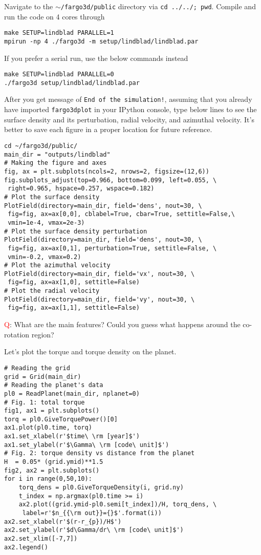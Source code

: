 \documentclass[14pt]{scrartcl}
\begin{document}
Navigate to the \texttt{$\sim$/fargo3d/public} directory via \texttt{cd ../../; pwd}. Compile and run the code on 4 cores through
\begin{verbatim}
make SETUP=lindblad PARALLEL=1
mpirun -np 4 ./fargo3d -m setup/lindblad/lindblad.par
\end{verbatim}
If you prefer a serial run, use the below commands instead
\begin{verbatim}
make SETUP=lindblad PARALLEL=0
./fargo3d setup/lindblad/lindblad.par
\end{verbatim}


After you get message of \texttt{End of the simulation!}, assuming that you already have imported \texttt{fargo3dplot} in your IPython console, type below lines to see the surface density and its perturbation, radial velocity, and azimuthal velocity. It's better to save each figure in a proper location for future reference.
\begin{verbatim}
cd ~/fargo3d/public/
main_dir = "outputs/lindblad"
# Making the figure and axes
fig, ax = plt.subplots(ncols=2, nrows=2, figsize=(12,6))
fig.subplots_adjust(top=0.966, bottom=0.099, left=0.055, \
 right=0.965, hspace=0.257, wspace=0.182)
# Plot the surface density
PlotField(directory=main_dir, field='dens', nout=30, \ 
 fig=fig, ax=ax[0,0], cblabel=True, cbar=True, settitle=False,\ 
 vmin=1e-4, vmax=2e-3)
# Plot the surface density perturbation
PlotField(directory=main_dir, field='dens', nout=30, \
 fig=fig, ax=ax[0,1], perturbation=True, settitle=False, \
 vmin=-0.2, vmax=0.2)
# Plot the azimuthal velocity
PlotField(directory=main_dir, field='vx', nout=30, \ 
 fig=fig, ax=ax[1,0], settitle=False)
# Plot the radial velocity
PlotField(directory=main_dir, field='vy', nout=30, \
 fig=fig, ax=ax[1,1], settitle=False)
\end{verbatim}

\textcolor{red}{Q}: What are the main features? Could you guess what happens around the co-rotation region?

Let's plot the torque and torque density on the planet. 
\begin{verbatim}
# Reading the grid
grid = Grid(main_dir)
# Reading the planet's data
pl0 = ReadPlanet(main_dir, nplanet=0)
# Fig. 1: total torque
fig1, ax1 = plt.subplots()
torq = pl0.GiveTorquePower()[0]
ax1.plot(pl0.time, torq)
ax1.set_xlabel(r'$time\ \rm [year]$')
ax1.set_ylabel(r'$\Gamma\ \rm [code\ unit]$')
# Fig. 2: torque density vs distance from the planet
H  = 0.05* (grid.ymid)**1.5
fig2, ax2 = plt.subplots()
for i in range(0,50,10):
    torq_dens = pl0.GiveTorqueDensity(i, grid.ny)
    t_index = np.argmax(pl0.time >= i)
    ax2.plot((grid.ymid-pl0.semi[t_index])/H, torq_dens, \
     label=r'$n_{{\rm out}}={}$'.format(i))
ax2.set_xlabel(r'$(r-r_{p})/H$')
ax2.set_ylabel(r'$d\Gamma/dr\ \rm [code\ unit]$')
ax2.set_xlim([-7,7])
ax2.legend()
\end{verbatim}
\end{document}
